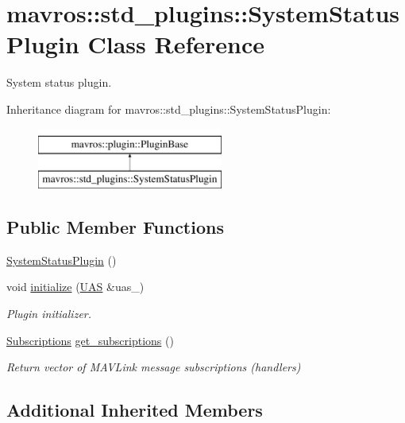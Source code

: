 \hypertarget{classmavros_1_1std__plugins_1_1SystemStatusPlugin}{}\section{mavros\+::std\+\_\+plugins\+::System\+Status\+Plugin Class Reference}
\label{classmavros_1_1std__plugins_1_1SystemStatusPlugin}


System status plugin.  


Inheritance diagram for mavros\+::std\+\_\+plugins\+::System\+Status\+Plugin\+:\begin{figure}[H]
\begin{center}
\leavevmode
\includegraphics[height=2.000000cm]{classmavros_1_1std__plugins_1_1SystemStatusPlugin}
\end{center}
\end{figure}
\subsection*{Public Member Functions}
\begin{DoxyCompactItemize}
\item 
\mbox{\hyperlink{group__plugin_ga93652f33205dc610638618b43a6addbc}{System\+Status\+Plugin}} ()
\item 
void \mbox{\hyperlink{group__plugin_ga6db82bbd7c82ba5963472e1946431313}{initialize}} (\mbox{\hyperlink{classmavros_1_1UAS}{U\+AS}} \&uas\+\_\+)
\begin{DoxyCompactList}\small\item\em Plugin initializer. \end{DoxyCompactList}\item 
\mbox{\hyperlink{group__plugin_ga8967d61fc77040e0c3ea5a4585d62a09}{Subscriptions}} \mbox{\hyperlink{group__plugin_gac4e5bdd397cd4f4d5a68a086879ad42e}{get\+\_\+subscriptions}} ()
\begin{DoxyCompactList}\small\item\em Return vector of M\+A\+V\+Link message subscriptions (handlers) \end{DoxyCompactList}\end{DoxyCompactItemize}
\subsection*{Additional Inherited Members}


